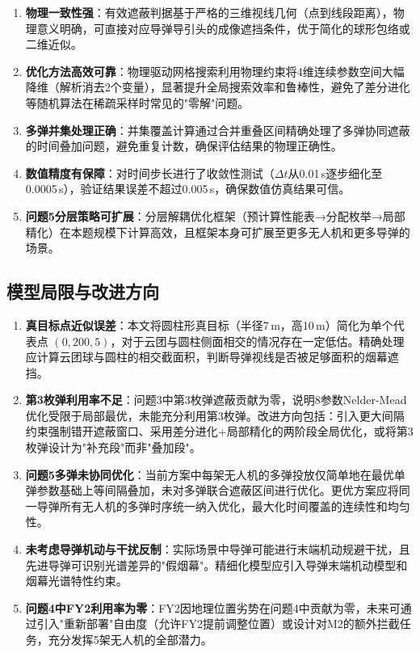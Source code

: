 \documentclass[12pt, a4paper]{article}
\begin{document}
\begin{enumerate}[leftmargin=2.5em]
  \item \textbf{物理一致性强}：有效遮蔽判据基于严格的三维视线几何（点到线段距离），物理意义明确，可直接对应导弹导引头的成像遮挡条件，优于简化的球形包络或二维近似。

  \item \textbf{优化方法高效可靠}：物理驱动网格搜索利用物理约束将4维连续参数空间大幅降维（解析消去2个变量），显著提升全局搜索效率和鲁棒性，避免了差分进化等随机算法在稀疏采样时常见的"零解"问题。

  \item \textbf{多弹并集处理正确}：并集覆盖计算通过合并重叠区间精确处理了多弹协同遮蔽的时间叠加问题，避免重复计数，确保评估结果的物理正确性。

  \item \textbf{数值精度有保障}：对时间步长进行了收敛性测试（$\Delta t$从0.01\,s逐步细化至0.0005\,s），验证结果误差不超过0.005\,s，确保数值仿真结果可信。

  \item \textbf{问题5分层策略可扩展}：分层解耦优化框架（预计算性能表→分配枚举→局部精化）在本题规模下计算高效，且框架本身可扩展至更多无人机和更多导弹的场景。
\end{enumerate}

\subsection{模型局限与改进方向}

\begin{enumerate}[leftmargin=2.5em]
  \item \textbf{真目标点近似误差}：本文将圆柱形真目标（半径7\,m，高10\,m）简化为单个代表点 $(0,200,5)$，对于云团与圆柱侧面相交的情况存在一定低估。精确处理应计算云团球与圆柱的相交截面积，判断导弹视线是否被足够面积的烟幕遮挡。

  \item \textbf{第3枚弹利用率不足}：问题3中第3枚弹遮蔽贡献为零，说明8参数Nelder-Mead优化受限于局部最优，未能充分利用第3枚弹。改进方向包括：引入更大间隔约束强制错开遮蔽窗口、采用差分进化+局部精化的两阶段全局优化，或将第3枚弹设计为"补充段"而非"叠加段"。

  \item \textbf{问题5多弹未协同优化}：当前方案中每架无人机的多弹投放仅简单地在最优单弹参数基础上等间隔叠加，未对多弹联合遮蔽区间进行优化。更优方案应将同一导弹所有无人机的多弹时序统一纳入优化，最大化时间覆盖的连续性和均匀性。

  \item \textbf{未考虑导弹机动与干扰反制}：实际场景中导弹可能进行末端机动规避干扰，且先进导弹可识别光谱差异的"假烟幕"。精细化模型应引入导弹末端机动模型和烟幕光谱特性约束。

  \item \textbf{问题4中FY2利用率为零}：FY2因地理位置劣势在问题4中贡献为零，未来可通过引入"重新部署"自由度（允许FY2提前调整位置）或设计对M2的额外拦截任务，充分发挥5架无人机的全部潜力。
\end{enumerate}
\end{document}

